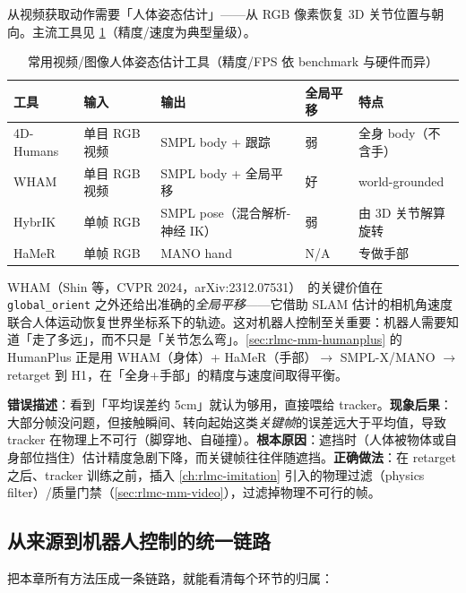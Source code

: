 从视频获取动作需要「人体姿态估计」——从 RGB 像素恢复 3D 关节位置与朝向。主流工具见 \cref{tab:rlmc-mm-pose}（精度/速度为典型量级）。

\begin{table}[ht]
\centering
\small
\caption{常用视频/图像人体姿态估计工具（精度/FPS 依 benchmark 与硬件而异）}
\label{tab:rlmc-mm-pose}
\begin{tabular}{@{}lllll@{}}
\toprule
工具 & 输入 & 输出 & 全局平移 & 特点 \\
\midrule
4D-Humans & 单目 RGB 视频 & SMPL body + 跟踪 & 弱 & 全身 body（不含手） \\
WHAM & 单目 RGB 视频 & SMPL body + 全局平移 & 好 & world-grounded \\
HybrIK & 单帧 RGB & SMPL pose（混合解析-神经 IK） & 弱 & 由 3D 关节解算旋转 \\
HaMeR & 单帧 RGB & MANO hand & N/A & 专做手部 \\
\bottomrule
\end{tabular}
\end{table}

WHAM（Shin 等，CVPR 2024，arXiv:2312.07531）\,\cite{shin2024wham} 的关键价值在 \texttt{global\_orient} 之外还给出准确的\emph{全局平移}——它借助 SLAM 估计的相机角速度联合人体运动恢复世界坐标系下的轨迹。这对机器人控制至关重要：机器人需要知道「走了多远」，而不只是「关节怎么弯」。\cref{sec:rlmc-mm-humanplus} 的 HumanPlus 正是用 WHAM（身体）+ HaMeR（手部）$\to$ SMPL-X/MANO $\to$ retarget 到 H1，在「全身+手部」的精度与速度间取得平衡。

\begin{pitfall}
\textbf{错误描述}：看到「平均误差约 5cm」就认为够用，直接喂给 tracker。\textbf{现象后果}：大部分帧没问题，但接触瞬间、转向起始这类\emph{关键帧}的误差远大于平均值，导致 tracker 在物理上不可行（脚穿地、自碰撞）。\textbf{根本原因}：遮挡时（人体被物体或自身部位挡住）估计精度急剧下降，而关键帧往往伴随遮挡。\textbf{正确做法}：在 retarget 之后、tracker 训练之前，插入 \cref{ch:rlmc-imitation} 引入的物理过滤（physics filter）/质量门禁（\cref{sec:rlmc-mm-video}），过滤掉物理不可行的帧。
\end{pitfall}

\subsection{从来源到机器人控制的统一链路}
\label{sec:rlmc-mm-pipeline}

把本章所有方法压成一条链路，就能看清每个环节的归属：


